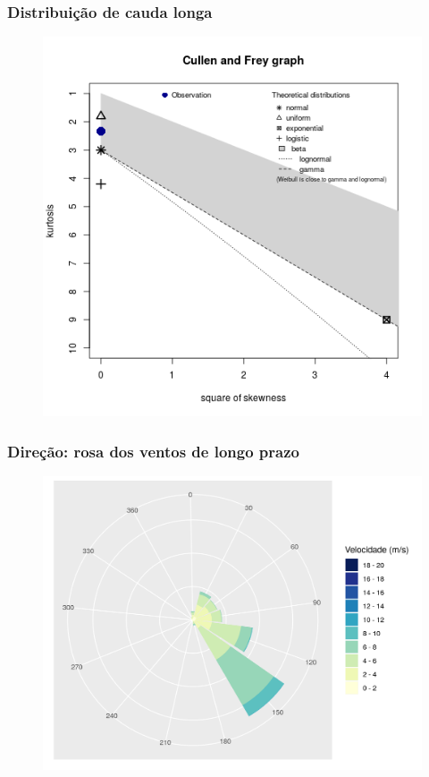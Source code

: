 \documentclass[mathserif,serif]{beamer}
\begin{document}
\begin{frame}
	\frametitle{Distribuição de cauda longa}
	\begin{figure}
		\centering
		\includegraphics[scale=0.5]{cullen}
	\end{figure}
\end{frame}

\begin{frame}
	\frametitle{Direção: rosa dos ventos de longo prazo}
	\begin{figure}
		\centering
		\includegraphics[scale=0.6]{windrose}
	\end{figure}
\end{frame}
\end{document}
